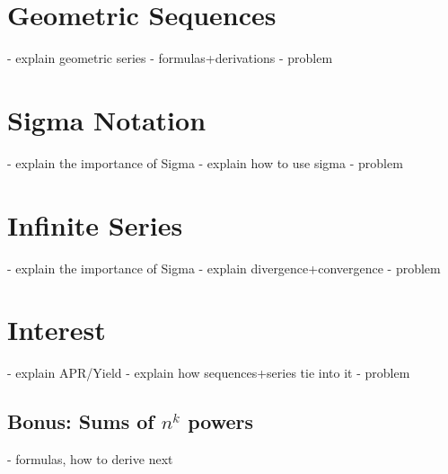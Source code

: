 \section{Geometric Sequences}
- explain geometric series
- formulas+derivations
- problem
\section{Sigma Notation}
- explain the importance of Sigma
- explain how to use sigma
- problem
\section{Infinite Series}
- explain the importance of Sigma
- explain divergence+convergence
- problem
\section{Interest}
- explain APR/Yield
- explain how sequences+series tie into it
- problem 

\begin{subappendices}
\section{Bonus: Sums of $n^k$ powers}
    - formulas, how to derive next
\end{subappendices}